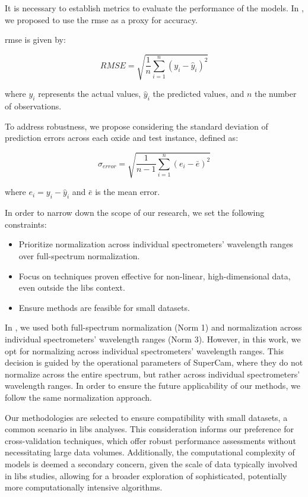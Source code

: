 It is necessary to establish metrics to evaluate the performance of the models.
In \cite{p9_paper}, we proposed to use the \gls{rmse} as a proxy for accuracy.

\gls{rmse} is given by:

\begin{equation}
    RMSE = \sqrt{\frac{1}{n} \sum_{i=1}^{n} (y_i - \hat{y}_i)^2}
\end{equation}

where $y_i$ represents the actual values, $\hat{y}_i$ the predicted values, and $n$ the number of observations.

To address robustness, we propose considering the standard deviation of prediction errors across each oxide and test instance, defined as:

\begin{equation}
    \sigma_{error} = \sqrt{\frac{1}{n-1} \sum_{i=1}^{n} (e_i - \bar{e})^2}
\end{equation}

where $e_i = y_i - \hat{y}_i$ and $\bar{e}$ is the mean error.

In order to narrow down the scope of our research, we set the following constraints:
\begin{itemize}
    \item Prioritize normalization across individual spectrometers' wavelength ranges over full-spectrum normalization.
    \item Focus on techniques proven effective for non-linear, high-dimensional data, even outside the \gls{libs} context.
    \item Ensure methods are feasible for small datasets.
\end{itemize}

In \cite{p9_paper}, we used both full-spectrum normalization (Norm 1) and normalization across individual spectrometers' wavelength ranges (Norm 3).
However, in this work, we opt for normalizing across individual spectrometers' wavelength ranges.
This decision is guided by the operational parameters of SuperCam\cite{andersonPostLandingMajorElements2022}, where they do not normalize across the entire spectrum, but rather across individual spectrometers' wavelength ranges.
In order to ensure the future applicability of our methods, we follow the same normalization approach.

Our methodologies are selected to ensure compatibility with small datasets, a common scenario in \gls{libs} analyses.
This consideration informs our preference for cross-validation techniques, which offer robust performance assessments without necessitating large data volumes.
Additionally, the computational complexity of models is deemed a secondary concern, given the scale of data typically involved in \gls{libs} studies, allowing for a broader exploration of sophisticated, potentially more computationally intensive algorithms.


